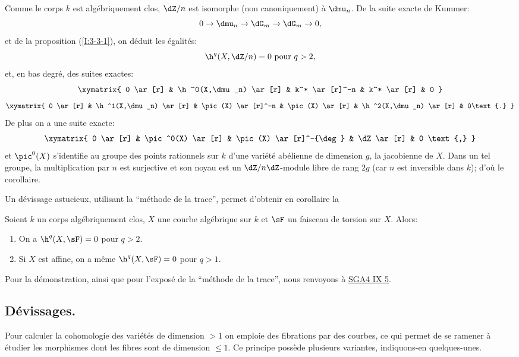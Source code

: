Comme le corps $k$ est algébriquement clos, $\dZ/n$ est isomorphe (non 
canoniquement) à $\dmu_n$. De la suite exacte de Kummer:
\[
  0 \to \dmu_n \to \dG_m \to \dG_m \to 0\text{,}
\]
et de la proposition (\ref{I:3-3-1}), on déduit les égalités:
\[
  \h^q(X,\dZ/n) = 0 \text{ pour $q>2$,}
\]
et, en bas degré, des suites exactes:
\[\xymatrix{
  0 \ar[r] 
    & \h^0(X,\dmu_n) \ar[r] 
    & k^* \ar[r]^-n 
    & k^* \ar[r] 
    & 0
}\]
\[\xymatrix{
  0 \ar[r] 
    & \h^1(X,\dmu_n) \ar[r] 
    & \pic(X) \ar[r]^-n 
    & \pic(X) \ar[r] 
    & \h^2(X,\dmu_n) \ar[r] 
    & 0\text{.}
}\]
De plus on a une suite exacte:
\[\xymatrix{
  0 \ar[r] 
    & \pic^0(X) \ar[r] 
    & \pic(X) \ar[r]^-{\deg}
    & \dZ \ar[r] 
    & 0 \text{,}
}\]
et $\pic^0(X)$ s'identifie au groupe des points rationnels sur $k$ d'une 
variété abélienne de dimension $g$, la jacobienne de $X$. Dans un tel 
groupe, la multiplication par $n$ est surjective et son noyau est un 
$\dZ/n\dZ$-module libre de rang $2g$ (car $n$ est inversible dans $k$); d'où 
le corollaire. 

Un dévissage astucieux, utilisant la ``méthode de la trace'', permet 
d'obtenir en corollaire la 





\begin{propositiondotdash}\label{I:3-3-6}
Soient $k$ un corps algébriquement clos, $X$ une courbe algébrique sur $k$ 
et $\sF$ un faisceau de torsion sur $X$. Alors:
\begin{enumerate}[\indent i)]
  \item On a $\h^q(X,\sF) = 0$ pour $q>2$.
  \item Si $X$ est affine, on a même $\h^q(X,\sF) = 0$ pour $q>1$.
\end{enumerate}
\end{propositiondotdash}

Pour la démonstration, ainsi que pour l'exposé de la ``méthode de la 
trace'', nous renvoyons à \hyperlink{cite.sga4}{SGA4 IX 5}.










\subsection{Dévissages.}\label{I:3-4}

Pour calculer la cohomologie des variétés de dimension $>1$ on emploie des 
fibrations par des courbes, ce qui permet de se ramener à étudier les 
morphismes dont les fibres sont de dimension $\leqslant 1$. Ce principe 
possède plusieurs variantes, indiquons-en quelques-unes.





